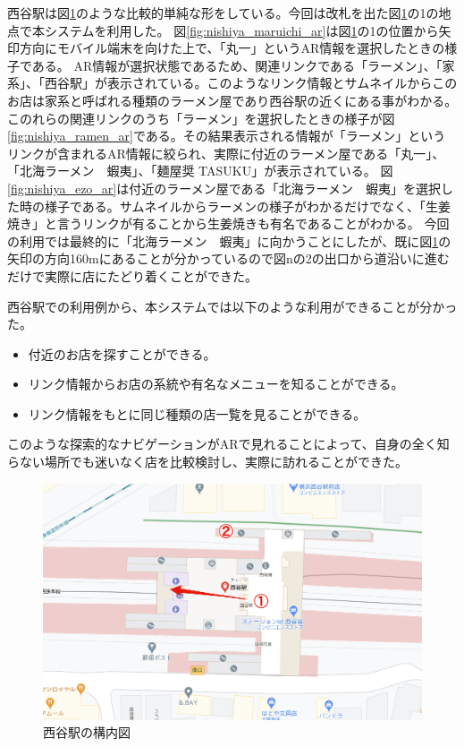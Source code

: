 西谷駅は図\ref{fig:nishiya_2d}のような比較的単純な形をしている。今回は改札を出た図\ref{fig:nishiya_2d}の\textcircled{\scriptsize{1}}の地点で本システムを利用した。
図\ref{fig:nishiya_maruichi_ar}は図\ref{fig:nishiya_2d}の\textcircled{\scriptsize{1}}の位置から矢印方向にモバイル端末を向けた上で、「丸一」というAR情報を選択したときの様子である。
AR情報が選択状態であるため、関連リンクである「ラーメン」、「家系」、「西谷駅」が表示されている。このようなリンク情報とサムネイルからこのお店は家系と呼ばれる種類のラーメン屋であり西谷駅の近くにある事がわかる。
このれらの関連リンクのうち「ラーメン」を選択したときの様子が図\ref{fig:nishiya_ramen_ar}である。その結果表示される情報が「ラーメン」というリンクが含まれるAR情報に絞られ、実際に付近のラーメン屋である「丸一」、「北海ラーメン　蝦夷」、「麺屋奨 TASUKU」が表示されている。
図\ref{fig:nishiya_ezo_ar}は付近のラーメン屋である「北海ラーメン　蝦夷」を選択した時の様子である。サムネイルからラーメンの様子がわかるだけでなく、「生姜焼き」と言うリンクが有ることから生姜焼きも有名であることがわかる。
今回の利用では最終的に「北海ラーメン　蝦夷」に向かうことにしたが、既に図\ref{fig:nishiya_2d}の矢印の方向160mにあることが分かっているので図nの\textcircled{\scriptsize{2}}の出口から道沿いに進むだけで実際に店にたどり着くことができた。

西谷駅での利用例から、本システムでは以下のような利用ができることが分かった。
\begin{itemize}
  \item 付近のお店を探すことができる。
  \item リンク情報からお店の系統や有名なメニューを知ることができる。
  \item リンク情報をもとに同じ種類の店一覧を見ることができる。
\end{itemize}
このような探索的なナビゲーションがARで見れることによって、自身の全く知らない場所でも迷いなく店を比較検討し、実際に訪れることができた。

\begin{figure}[h]
  \centering
  \includegraphics[width=120mm]{images/nishiya_2d.png}
  \caption{西谷駅の構内図} \label{fig:nishiya_2d}
\end{figure}

